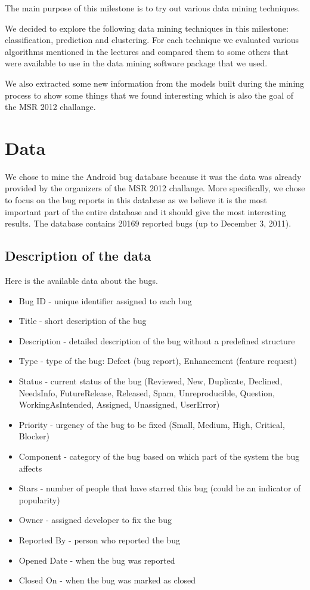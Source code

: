 The main purpose of this milestone is to try out various data mining techniques.

We decided to explore the following data mining techniques in this milestone: classification, prediction and clustering. For each technique we evaluated various algorithms mentioned in the lectures and compared them to some others that were available to use in the data mining software package that we used. 

We also extracted some new information from the models built during the mining process to show some things that we found interesting which is also the goal of the MSR 2012 challange.

\section{Data} %
\label{sub:Data}
We chose to mine the Android bug database because it was the data was already provided by the organizers of the MSR 2012 challange. More specifically, we chose to focus on the bug reports in this database as we believe it is the most important part of the entire database and it should give the most interesting results. The database contains 20169 reported bugs (up to December 3, 2011). 

\subsection*{Description of the data} %
\label{sub:Description of the data}

Here is the available data about the bugs.

\begin{itemize}
\item Bug ID - unique identifier assigned to each bug
\item Title - short description of the bug
\item Description - detailed description of the bug without a predefined structure
\item Type - type of the bug: Defect (bug report), Enhancement (feature request)
\item Status - current status of the bug (Reviewed, New, Duplicate, Declined, NeedsInfo, FutureRelease, Released, Spam, Unreproducible, Question, WorkingAsIntended, Assigned, Unassigned, UserError)
\item Priority - urgency of the bug to be fixed (Small, Medium, High, Critical, Blocker)
\item Component - category of the bug based on which part of the system the bug affects
\item Stars - number of people that have starred this bug (could be an indicator of popularity)
\item Owner - assigned developer to fix  the bug
\item Reported By - person who reported the bug
\item Opened Date - when the bug was reported
\item Closed On - when the bug was marked as closed
\end{itemize}

